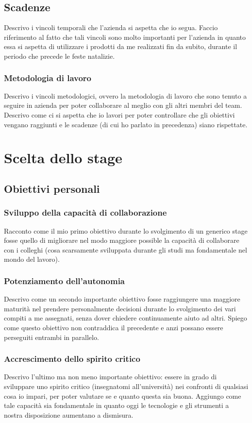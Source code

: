 		\subsection{Scadenze}
			Descrivo i vincoli temporali che l'azienda si aspetta che io segua. Faccio riferimento al fatto che tali vincoli sono molto
			importanti per l'azienda in quanto essa si aspetta di utilizzare i prodotti da me realizzati fin da subito, durante il
			periodo che precede le feste natalizie.
		\subsubsection{Metodologia di lavoro}
			Descrivo i vincoli metodologici, ovvero la metodologia di lavoro che sono tenuto a seguire in azienda per poter collaborare
			al meglio con gli altri membri del team. Descrivo come ci si aspetta che io lavori per poter controllare che gli obiettivi
			vengano raggiunti e le scadenze (di cui ho parlato in precedenza) siano rispettate.
	\section{Scelta dello stage}
		\subsection{Obiettivi personali}
			\subsubsection{Sviluppo della capacità di collaborazione}
				Racconto come il mio primo obiettivo durante lo svolgimento di un generico stage fosse quello di migliorare nel modo
				maggiore possible la capacità di collaborare con i colleghi (cosa scarsamente sviluppata durante gli studi ma
				fondamentale nel mondo del lavoro).
			\subsubsection{Potenziamento dell'autonomia}
				Descrivo come un secondo importante obiettivo fosse raggiungere una maggiore maturità nel prendere personalmente
				decisioni durante lo svolgimento dei vari compiti a me assegnati, senza dover chiedere continuamente aiuto ad altri.
				Spiego come questo obiettivo non contraddica il precedente e anzi possano essere perseguiti entrambi in parallelo.
			\subsubsection{Accrescimento dello spirito critico}
				Descrivo l'ultimo ma non meno importante obiettivo: essere in grado di sviluppare uno spirito critico (insegnatomi
				all'università) nei confronti di qualsiasi cosa io impari, per poter valutare se e quanto questa sia buona. Aggiungo
				come tale capacità sia fondamentale in quanto oggi le tecnologie e gli strumenti a nostra disposizione aumentano a
				dismisura.

